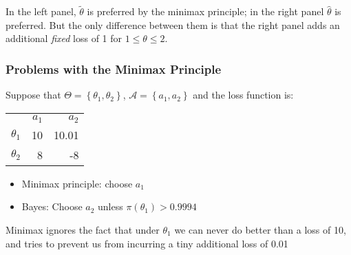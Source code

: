 \begin{frame}
\begin{columns}
  \end{columns}

  \vspace{2em}

  \small

  In the left panel, $\widetilde{\theta}$ is preferred by the minimax principle; in the right panel $\widehat{\theta}$ is preferred.
  But the only difference between them is that the right panel adds an additional \emph{fixed} loss of 1 for $1 \leq \theta \leq 2$.

  
\end{frame}
\begin{frame}
  \frametitle{Problems with the Minimax Principle}
  \small

  Suppose that $\Theta = \left\{ \theta_1, \theta_2 \right\}$, $\mathcal{A} = \left\{ a_1, a_2 \right\}$ and the loss function is:
  \begin{table}
    \centering
    \begin{tabular}{lrr}
      & $a_1$ & $a_2$ \\
      \cline{2-3}
      $\theta_1$ & \multicolumn{1}{|r|}{10} & \multicolumn{1}{r|}{10.01} \\
      \cline{2-3}
      $\theta_2$ & \multicolumn{1}{|r|}{8} & \multicolumn{1}{r|}{-8}\\
      \cline{2-3}
    \end{tabular}
  \end{table}
  
  \vspace{1em}

  \begin{itemize}
    \item Minimax principle: choose $a_1$
    \item Bayes: Choose $a_2$ unless $\pi(\theta_1) > 0.9994$
  \end{itemize}


  \vspace{1em}

  \alert{Minimax ignores the fact that under $\theta_1$ we can never do better than a loss of 10, and tries to prevent us from incurring a tiny additional loss of 0.01}

\end{frame}
%
